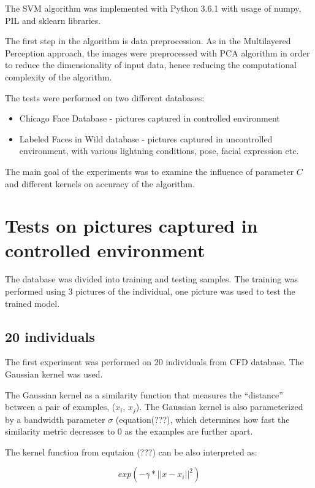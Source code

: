 The SVM algorithm was implemented with Python 3.6.1 with usage of numpy, PIL and sklearn libraries.

The first step in the algorithm is data preprocession. As in the Multilayered Perception approach, the images were preprocessed with PCA algorithm in order to reduce the dimensionality of input data, hence reducing the computational complexity of the algorithm.

The tests were performed on two different databases: 
\begin{itemize}
\itemsep0em 
\item Chicago Face Database - pictures captured in controlled environment
\item Labeled Faces in Wild database - pictures captured in uncontrolled environment, with various lightning conditions, pose, facial expression etc. 
\end{itemize}

The main goal of the experiments was to examine the influence of parameter $C$ and different kernels on accuracy of the algorithm.

\section{Tests on pictures captured in controlled environment}

The database was divided into training and testing samples. The training was performed using 3 pictures of the individual, one picture was used to test the trained model. 

\subsection{20 individuals}

The first experiment was performed on 20 individuals from CFD database. 
The Gaussian kernel was used. 

The Gaussian kernel as a similarity function that measures the “distance” between a pair of examples, ($x_{i}$, $x_{j}$). The Gaussian kernel is also parameterized by a bandwidth parameter $\sigma$ (equation(???), which determines how fast the similarity metric decreases to 0 as the examples are further apart. 

The kernel function from equtaion (???) can be also interpreted as:

\begin{equation}
exp(-\gamma * ||x-x_{i}||^2)
\end{equation}

